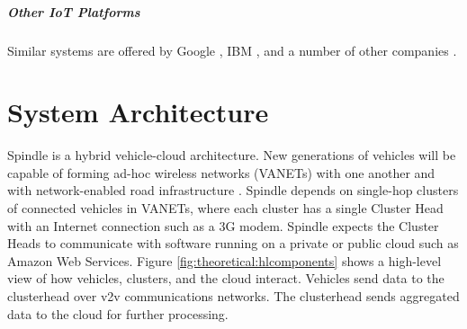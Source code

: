 \documentclass{thesis}
\begin{document}
        \paragraph{Other IoT Platforms}
            Similar systems are offered by Google \cite{google:iot}, IBM \cite{ibm:iot}, and a number of other companies
            \cite{forbes:iot}. %

\chapter{System Architecture}
    Spindle is a hybrid vehicle-cloud architecture. New generations of vehicles
    will be capable of forming ad-hoc wireless networks (VANETs) with one another and
    with network-enabled road infrastructure \cite{vanets:overview}. Spindle depends
    on single-hop clusters of connected vehicles in VANETs, where each cluster has a
    single Cluster Head with an Internet connection such as a 3G modem. Spindle
    expects the Cluster Heads to communicate with software running on a private or 
    public cloud such as Amazon Web Services. Figure \ref{fig:theoretical:hlcomponents}
    shows a high-level view of how vehicles, clusters, and the cloud interact. Vehicles
    send data to the clusterhead over v2v communications networks. The clusterhead
    sends aggregated data to the cloud for further processing. %



\end{document}
